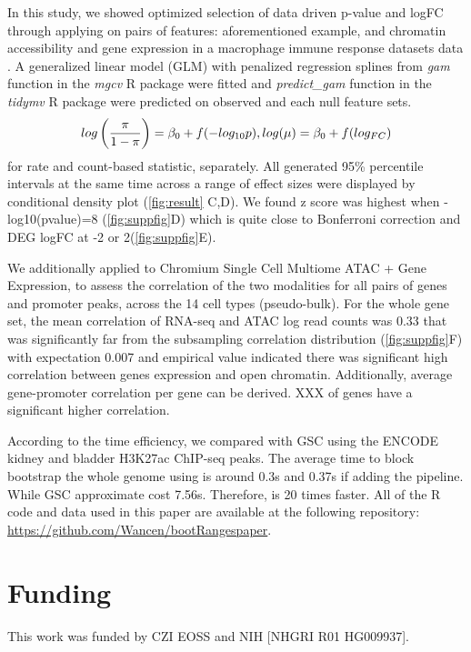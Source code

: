 In this study, we showed optimized selection of data driven p-value
and logFC through applying \bootranges on pairs of features:
aforementioned example, and chromatin accessibility and gene
expression in a macrophage immune response datasets data
\citep{alasoo2018shared}. A generalized linear model (GLM) with
penalized regression splines from \textit{gam} function in the
\emph{mgcv} R package were fitted and \textit{predict\_gam} function
in the \emph{tidymv} R package were predicted on observed and each
null feature sets.
$$
\setlength{\abovedisplayskip}{3pt}
\setlength{\belowdisplayskip}{3pt}
log \left( \frac{\pi}{1-\pi} \right) = \beta_0  + f (-log_{10}p), log(\mu) = \beta_0 + f (log_{FC})
$$ 
for rate and count-based statistic, separately.  All generated 95\%
percentile intervals at the same time across a range of effect sizes
were displayed by conditional density plot (\cref{fig:result} C,D). We
found z score was highest when -log10(pvalue)=8 (\cref{fig:suppfig}D)
which is quite close to Bonferroni correction and DEG logFC at -2 or
2(\cref{fig:suppfig}E).

We additionally applied \bootranges to Chromium Single Cell Multiome
ATAC + Gene Expression, to assess the correlation of the two
modalities for all pairs of genes and promoter peaks, across the 14
cell types (pseudo-bulk).  For the whole gene set, the mean
correlation of RNA-seq and ATAC log read counts was 0.33 that was
significantly far from the subsampling correlation distribution
(\cref{fig:suppfig}F) with expectation 0.007 and empirical value
indicated there was significant high correlation between genes
expression and open chromatin. Additionally, average gene-promoter
correlation per gene can be derived. XXX of genes have a significant
higher correlation.

According to the time efficiency, we compared with GSC using the
ENCODE kidney and bladder H3K27ac ChIP-seq peaks. The average time to
block bootstrap the whole genome using \bootranges is around 0.3s and
0.37s if adding the \plyranges pipeline. While GSC approximate cost
7.56s. Therefore, \bootranges is 20 times faster.  All of the R code
and data used in this paper are available at the following repository:
\url{https://github.com/Wancen/bootRangespaper}.

\vspace*{-25pt}

\section*{Funding}
This work was funded by CZI EOSS and NIH [NHGRI R01 HG009937]. 
